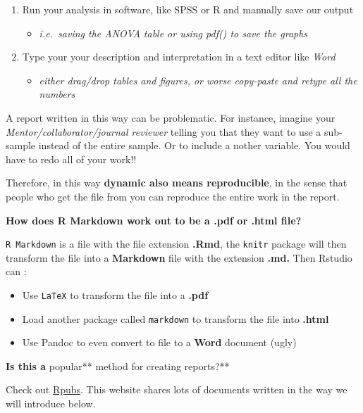 \documentclass[]{book}
\providecommand{\tightlist}{%
  \setlength{\itemsep}{0pt}\setlength{\parskip}{0pt}}
\begin{document}
\begin{enumerate}
\def\labelenumi{\arabic{enumi}.}
\tightlist
\item
  Run your analysis in software, like SPSS or R and manually save our
  output

  \begin{itemize}
  \tightlist
  \item
    \emph{i.e.~saving the ANOVA table or using pdf() to save the graphs}
  \end{itemize}
\item
  Type your your description and interpretation in a text editor like
  \emph{Word}

  \begin{itemize}
  \tightlist
  \item
    \emph{either drag/drop tables and figures, or worse copy-paste and
    retype all the numbers}
  \end{itemize}
\end{enumerate}

A report written in this way can be problematic. For instance, imagine
your \emph{Mentor/collaborator/journal reviewer} telling you that they
want to use a sub-sample instead of the entire sample. Or to include a
nother variable. You would have to redo all of your work!!

Therefore, in this way \textbf{dynamic also means reproducible}, in the
sense that people who get the file from you can reproduce the entire
work in the report.

\textbf{How does R Markdown work out to be a .pdf or .html file?}

\texttt{R\ Markdown} is a file with the file extension \textbf{.Rmd},
the \texttt{knitr} package will then transform the file into a
\textbf{Markdown} file with the extension \textbf{.md.} Then Rstudio can
\citep{xie2015}:

\begin{itemize}
\item
  Use \texttt{LaTeX} to transform the file into a \textbf{.pdf}
\item
  Load another package called \texttt{markdown} to transform the file
  into \textbf{.html}
\item
  Use Pandoc to even convert to file to a \textbf{Word} document (ugly)
\end{itemize}

\textbf{Is this a }popular** method for creating reports?**

Check out \href{http://rpubs.com/}{Rpubs}. This website shares lots of
documents written in the way we will introduce below.
\end{document}
